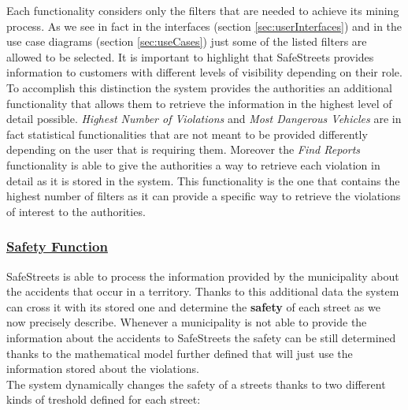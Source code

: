		Each functionality considers only the filters that are needed to achieve its mining process. As we see in fact in the interfaces (section \ref{sec:userInterfaces}) and in the use case diagrams (section \ref{sec:useCases}) just some of the listed filters are allowed to be selected. It is important to highlight that SafeStreets provides information to customers with different levels of visibility depending on their role. To accomplish this distinction the system provides the authorities an additional functionality that allows them to retrieve the information in the highest level of detail possible. \emph{Highest Number of Violations} and \emph{Most Dangerous Vehicles} are in fact statistical functionalities that are not meant to be provided differently depending on the user that is requiring them. Moreover the \emph{Find Reports} functionality is able to give the authorities a way to retrieve each violation in detail as it is stored in the system. This functionality is the one that contains the highest number of filters as it can provide a specific way to retrieve the violations of interest to the authorities. 

	\subsubsection[Safety Function]{\hyperlink{toc}{Safety Function}}
		\label{sec:safetyFunction}
		SafeStreets is able to process the information provided by the municipality about the accidents that occur in a territory. Thanks to this additional data the system can cross it with its stored one and determine the \textbf{safety} of each street as we now precisely describe. Whenever a municipality is not able to provide the information about the accidents to SafeStreets the safety can be still determined thanks to the mathematical model further defined that will just use the information stored about the violations. \\
		
		The system dynamically changes the safety of a streets thanks to two different kinds of treshold defined for each street:
		
